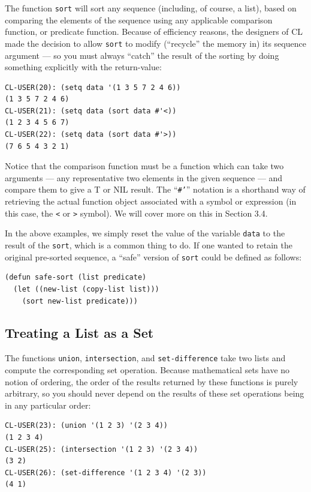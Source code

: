 The function \texttt{sort} will sort any sequence (including, of course, a list), based on comparing
the elements of the sequence using any applicable comparison function, or predicate function.
Because of efficiency reasons, the designers of CL made the decision to allow \texttt{sort} to modify
(``recycle'' the memory in) its sequence argument --- so you must always ``catch'' the result
of the sorting by doing something explicitly with the return-value:

\begin{verbatim}
CL-USER(20): (setq data '(1 3 5 7 2 4 6))
(1 3 5 7 2 4 6)
CL-USER(21): (setq data (sort data #'<))
(1 2 3 4 5 6 7)
CL-USER(22): (setq data (sort data #'>))
(7 6 5 4 3 2 1)
\end{verbatim}

Notice that the comparison function must be a function which can take two arguments ---
any representative two elements in the given sequence --- and compare them to give a T or
NIL result. The ``\texttt{\#'}'' notation is a shorthand way of retrieving the actual function object
associated with a symbol or expression (in this case, the \texttt{<} or \texttt{>} symbol). We will cover more
on this in Section 3.4.

In the above examples, we simply reset the value of the variable \texttt{data} to the result of
the \texttt{sort}, which is a common thing to do. If one wanted to retain the original pre-sorted
sequence, a ``safe'' version of \texttt{sort} could be defined as follows:

\begin{verbatim}
(defun safe-sort (list predicate)
  (let ((new-list (copy-list list)))
    (sort new-list predicate)))
\end{verbatim}

\subsection{Treating a List as a Set}

The functions \texttt{union}, \texttt{intersection}, and \texttt{set-difference} take two lists and compute the
corresponding set operation. Because mathematical sets have no notion of ordering, the
order of the results returned by these functions is purely arbitrary, so you should never
depend on the results of these set operations being in any particular order:

\begin{verbatim}
CL-USER(23): (union '(1 2 3) '(2 3 4))
(1 2 3 4)
CL-USER(25): (intersection '(1 2 3) '(2 3 4))
(3 2)
CL-USER(26): (set-difference '(1 2 3 4) '(2 3))
(4 1)
\end{verbatim}

